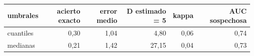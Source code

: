 \begin{tabular}{lrrrrr}
\toprule
umbrales & acierto exacto & error medio & D estimado = 5 & kappa & AUC sospechosa \\
\midrule
cuantiles & 0{,}30 & 1{,}04 & 4{,}80 & 0{,}06 & 0{,}74 \\
medianas & 0{,}21 & 1{,}42 & 27{,}15 & 0{,}04 & 0{,}73 \\
\bottomrule
\end{tabular}
